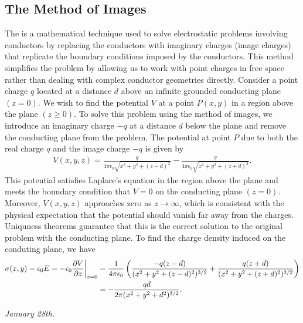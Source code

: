 \subsection{The Method of Images}
The  is a mathematical technique used to solve electrostatic problems involving conductors by replacing the conductors with imaginary charges (image charges) that replicate the boundary conditions imposed by the conductors. This method simplifies the problem by allowing us to work with point charges in free space rather than dealing with complex conductor geometries directly. Consider a point charge $q$ located at a distance $d$ above an infinite grounded conducting plane $(z=0)$. We wish to find the potential $V$ at a point $P(x,y)$ in a region above the plane $(z \geq 0)$. To solve this problem using the method of images, we introduce an imaginary charge $-q$ at a distance $d$ below the plane and remove the conducting plane from the problem. The potential at point $P$ due to both the real charge $q$ and the image charge $-q$ is given by
\begin{align}
    V(x,y,z) = \frac{q}{4 \pi \epsilon_{0} \sqrt{x^{2} + y^{2} + (z - d)^{2}}} - \frac{q}{4 \pi \epsilon_{0} \sqrt{x^{2} + y^{2} + (z + d)^{2}}}.
\end{align}
This potential satisfies Laplace's equation in the region above the plane and meets the boundary condition that $V = 0$ on the conducting plane $(z=0)$. Moreover, $V(x,y,z)$ approaches zero as $z \to \infty$, which is consistent with the physical expectation that the potential should vanish far away from the charges. Uniquness theorems guarantee that this is the correct solution to the original problem with the conducting plane. To find the charge density induced on the conduting plane, we have
\begin{align}
    \sigma(x,y) = \epsilon_{0}E = -\epsilon_{0} \frac{\partial V}{\partial z} \bigg|_{z=0} &= \frac{1}{4 \pi \epsilon_{0}} \left( \frac{-q(z-d)}{(x^{2}+y^{2}+(z-d)^{2})^{3/2}} + \frac{q(z+d)}{(x^{2}+y^{2}+(z+d)^{2})^{3/2}}  \right) \notag \\ &= -\frac{q d}{2 \pi (x^{2} + y^{2} + d^{2})^{3/2}}.
\end{align}

\noindent \textit{January 28th}.

